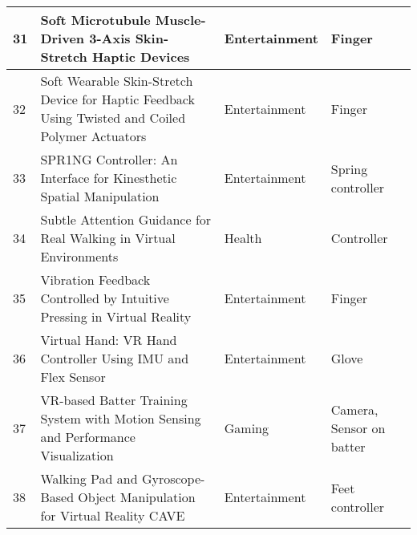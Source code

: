 \begin{landscape}
\begin{table}[]
{\begin{tabular}{|l|l|l|l|}
				31                               & Soft Microtubule Muscle-Driven 3-Axis Skin-Stretch Haptic Devices                                                                         & Entertainment                            & Finger                                                                      \\ \hline
				32                               & Soft Wearable Skin-Stretch Device for Haptic Feedback Using Twisted and Coiled Polymer Actuators                                          & Entertainment                            & Finger                                                                      \\ \hline
				33                               & SPR1NG Controller: An Interface for Kinesthetic Spatial Manipulation                                                                      & Entertainment                            & Spring controller                                                           \\ \hline
				34                               & Subtle Attention Guidance for Real Walking in Virtual Environments                                                                        & Health                                   & Controller                                                                  \\ \hline
				35                               & Vibration Feedback Controlled by Intuitive Pressing in Virtual Reality                                                                    & Entertainment                            & Finger                                                                      \\ \hline
				36                               & Virtual Hand: VR Hand Controller Using IMU and Flex Sensor                                                                                & Entertainment                            & Glove                                                                       \\ \hline
				37                               & VR-based Batter Training System with Motion Sensing and Performance Visualization                                                         & Gaming                                   & Camera, Sensor on batter                                                    \\ \hline
				38                               & Walking Pad and Gyroscope-Based Object Manipulation for Virtual Reality CAVE                                                              & Entertainment                            & Feet controller                                                             \\ \hline

\end{tabular}}
\end{table}
\end{landscape}
